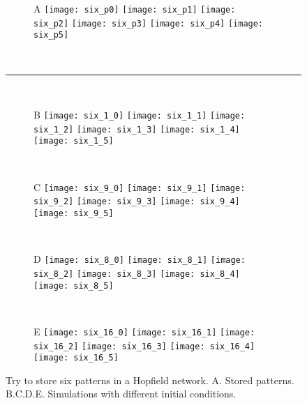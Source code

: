 \newpage

\null
\vfill

\begin{figure}[H]
  \centering
  \begin{subfigure}{\textwidth}
    \textsf{A}
    \centering
    \texttt{[image: six\_p0]}
    \texttt{[image: six\_p1]}
    \texttt{[image: six\_p2]}
    \texttt{[image: six\_p3]}
    \texttt{[image: six\_p4]}
    \texttt{[image: six\_p5]}
  \end{subfigure}\\[1em]
  \hspace{1em}\rule{0.95\textwidth}{1.8pt}\\
  \vspace{1em}
  \begin{subfigure}{\textwidth}
    \textsf{B}
    \centering
    \texttt{[image: six\_1\_0]}
    \texttt{[image: six\_1\_1]}
    \texttt{[image: six\_1\_2]}
    \texttt{[image: six\_1\_3]}
    \texttt{[image: six\_1\_4]}
    \texttt{[image: six\_1\_5]}
  \end{subfigure}\\[0.8em]
  \begin{subfigure}{\textwidth}
    \textsf{C}
    \centering
    \texttt{[image: six\_9\_0]}
    \texttt{[image: six\_9\_1]}
    \texttt{[image: six\_9\_2]}
    \texttt{[image: six\_9\_3]}
    \texttt{[image: six\_9\_4]}
    \texttt{[image: six\_9\_5]}
  \end{subfigure}\\[0.8em]
  \begin{subfigure}{\textwidth}
    \textsf{D}
    \centering
    \texttt{[image: six\_8\_0]}
    \texttt{[image: six\_8\_1]}
    \texttt{[image: six\_8\_2]}
    \texttt{[image: six\_8\_3]}
    \texttt{[image: six\_8\_4]}
    \texttt{[image: six\_8\_5]}
  \end{subfigure}\\[0.8em]
  \begin{subfigure}{\textwidth}
    \textsf{E}
    \centering
    \texttt{[image: six\_16\_0]}
    \texttt{[image: six\_16\_1]}
    \texttt{[image: six\_16\_2]}
    \texttt{[image: six\_16\_3]}
    \texttt{[image: six\_16\_4]}
    \texttt{[image: six\_16\_5]}
  \end{subfigure}
  \vspace{1.2em}
  \caption{Try to store six patterns in a Hopfield network.
           \textsf{A.} Stored patterns.
           \textsf{B.C.D.E.} Simulations with different initial conditions.}
  \label{fig: Hopfield_six}
\end{figure}

\vfill
